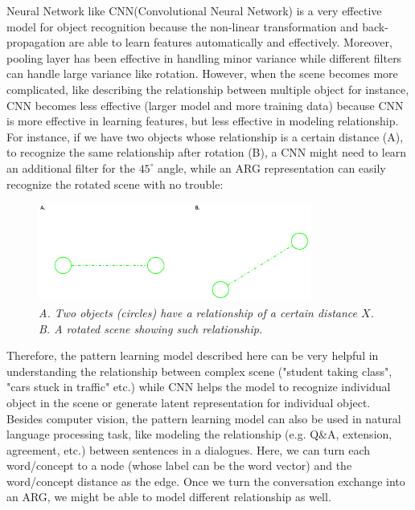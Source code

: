 Neural Network like CNN(Convolutional Neural Network) is a very effective model for object recognition because the non-linear transformation and back-propagation are able to learn features automatically and effectively. Moreover, pooling layer has been effective in handling minor variance while different filters can handle large variance like rotation\footnotemark. However, when the scene becomes more complicated, like describing the relationship between multiple object for instance, CNN becomes less effective (larger model and more training data) because CNN is more effective in learning features, but less effective in modeling relationship. For instance, if we have two objects whose relationship is a certain distance (A), to recognize the same relationship after rotation (B), a CNN might need to learn an additional filter for the $45^\circ$ angle, while an ARG representation can easily recognize the rotated scene with no trouble:\\

\begin{figure}[h]
	\centering
	\captionsetup{justification=centering}
	\includegraphics[width=0.8\textwidth]{figs/rotation.png}
	\caption[Caption for LOF]{\emph{A. Two objects (circles) have a relationship of a certain distance $X$.\\ B. A rotated scene showing such relationship. }}
	\label{fig:rotation}
\end{figure}

Therefore, the pattern learning model described here can be very helpful in understanding the relationship between complex scene ("student taking class", "cars stuck in traffic" etc.) while CNN helps the model to recognize individual object in the scene or generate latent representation for individual object.\\

Besides computer vision, the pattern learning model can also be used in natural language processing task, like modeling the relationship (e.g. Q\&A, extension, agreement, etc.) between sentences in a dialogues. Here, we can turn each word/concept to a node (whose label can be the word vector) and the word/concept distance as the edge. Once we turn the conversation exchange into an ARG, we might be able to model different relationship as well.\\

